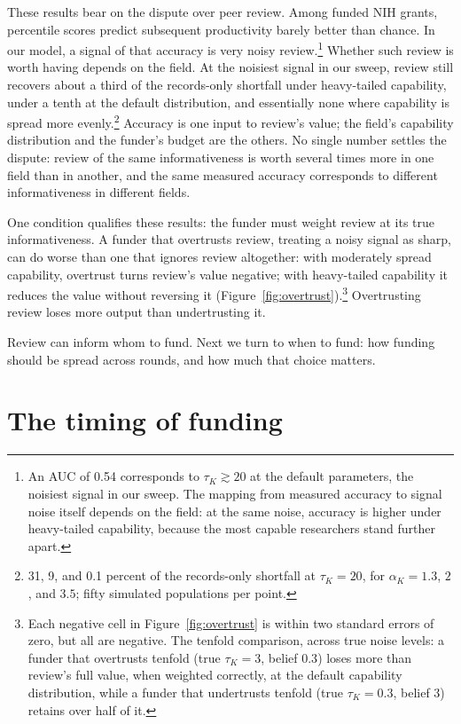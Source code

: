 \documentclass[article, 11pt, reqno]{amsart}
\theoremstyle{named}
\begin{document}
These results bear on the dispute over peer review. Among funded NIH grants, percentile scores predict subsequent productivity barely better than chance. In our model, a signal of that accuracy is very noisy review.\footnote{An AUC of 0.54 \citep{Fang2016} corresponds to $\tau_K \gtrsim 20$ at the default parameters, the noisiest signal in our sweep. The mapping from measured accuracy to signal noise itself depends on the field: at the same noise, accuracy is higher under heavy-tailed capability, because the most capable researchers stand further apart.} Whether such review is worth having depends on the field. At the noisiest signal in our sweep, review still recovers about a third of the records-only shortfall under heavy-tailed capability, under a tenth at the default distribution, and essentially none where capability is spread more evenly.\footnote{31, 9, and 0.1 percent of the records-only shortfall at $\tau_K = 20$, for $\alpha_K = 1.3$, $2$, and $3.5$; fifty simulated populations per point.} Accuracy is one input to review's value; the field's capability distribution and the funder's budget are the others. No single number settles the dispute: review of the same informativeness is worth several times more in one field than in another, and the same measured accuracy corresponds to different informativeness in different fields.

One condition qualifies these results: the funder must weight review at its true informativeness. A funder that overtrusts review, treating a noisy signal as sharp, can do worse than one that ignores review altogether: with moderately spread capability, overtrust turns review's value negative; with heavy-tailed capability it reduces the value without reversing it (Figure~\ref{fig:overtrust}).\footnote{Each negative cell in Figure~\ref{fig:overtrust} is within two standard errors of zero, but all are negative. The tenfold comparison, across true noise levels: a funder that overtrusts tenfold (true $\tau_K = 3$, belief $0.3$) loses more than review's full value, when weighted correctly, at the default capability distribution, while a funder that undertrusts tenfold (true $\tau_K = 0.3$, belief $3$) retains over half of it.} Overtrusting review loses more output than undertrusting it.



Review can inform whom to fund. Next we turn to when to fund: how funding should be spread across rounds, and how much that choice matters.

\section{The timing of funding}\label{sec:timing}
\end{document}
